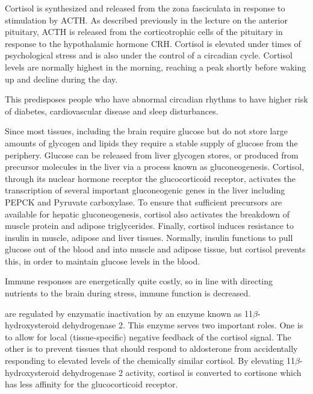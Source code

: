 \documentclass{tufte-handout}
\begin{document}
Cortisol is synthesized and released from the zona fasciculata in response to stimulation by ACTH.  As described previously in the lecture on the anterior pituitary, ACTH is released from the corticotrophic cells of the pituitary in response to the hypothalamic hormone CRH.  Cortisol is elevated under times of psychological stress and is also under the control of a circadian cycle.  Cortisol levels are normally highest in the morning, reaching a peak shortly before waking up and decline during the day.

  This predisposes people who have abnormal circadian rhythms to have higher risk of diabetes, cardiovascular disease and sleep disturbances\cite{Scheer2009,Pan2011}.

  Since most tissues, including the brain require glucose but do not store large amounts of glycogen and lipids they require a stable supply of glucose from the periphery.  Glucose can be released from liver glycogen stores, or produced from precursor molecules in the liver via a process known as gluconeogenesis.  Cortisol, through its nuclear hormone receptor the glucocorticoid receptor, activates the transcription of several important gluconeogenic genes in the liver including PEPCK and Pyruvate carboxylase.  To ensure that sufficient precursors are available for hepatic gluconeogenesis, cortisol also activates the breakdown of muscle protein and adipose triglycerides.  Finally, cortisol induces resistance to insulin in muscle, adipose and liver tissues.  Normally, insulin functions to pull glucose out of the blood and into muscle and adipose tissue, but cortisol prevents this, in order to maintain glucose levels in the blood.

  Immune responses are energetically quite costly, so in line with directing nutrients to the brain during stress, immune function is decreased.


 are regulated by enzymatic inactivation by an enzyme known as 11$\beta$-hydroxysteroid dehydrogenase 2.  This enzyme serves two important roles.  One is to allow for local (tissue-specific) negative feedback of the cortisol signal.  The other is to prevent tissues that should respond to aldosterone from accidentally responding to elevated levels of the chemically similar cortisol.  By elevating 11$\beta$-hydroxysteroid dehydrogenase 2 activity, cortisol is converted to cortisone which has less affinity for the glucocorticoid receptor.
\end{document}
